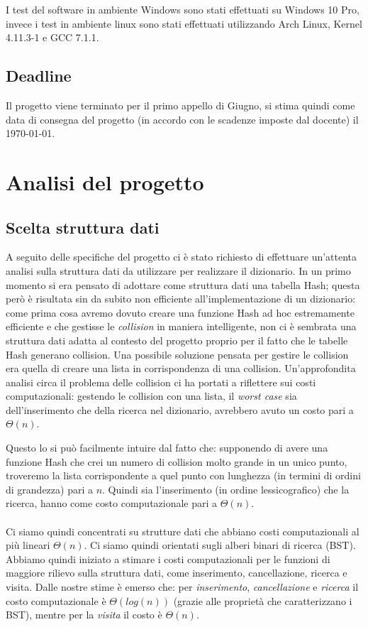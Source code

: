 \documentclass[paper=a4, fontsize=11pt,twoside]{scrartcl}   %
\begin{document}
			 	I test del software in ambiente Windows sono stati effettuati su Windows 10 Pro, invece i test in ambiente linux sono stati effettuati utilizzando Arch Linux, Kernel 4.11.3-1 e GCC 7.1.1.
			 \subsection{Deadline}
			 	Il progetto viene terminato per il primo appello di Giugno, si stima quindi come data di consegna del progetto (in accordo con le scadenze imposte dal docente) il \today.
			 	
		\section{Analisi del progetto}
			\subsection{Scelta struttura dati}
				 A seguito delle specifiche del progetto ci è stato richiesto di effettuare un'attenta analisi sulla struttura dati da utilizzare per realizzare il dizionario. In un primo momento si era pensato di adottare come struttura dati una tabella Hash; questa però è risultata sin da subito non efficiente all'implementazione di un dizionario: come prima cosa avremo dovuto creare una funzione Hash ad hoc estremamente efficiente e che gestisse le \textit{collision} in maniera intelligente, non ci è sembrata una struttura dati adatta al contesto del progetto proprio per il fatto che le tabelle Hash generano collision. Una possibile soluzione pensata per gestire le collision era quella di creare una lista in corrispondenza di una collision. Un'approfondita analisi circa il problema delle collision ci ha portati a riflettere sui costi computazionali: gestendo le collision con una lista, il \textit{worst case} sia dell'inserimento che della ricerca nel dizionario, avrebbero avuto un costo pari a $\Theta(n)$.
				 
				 Questo lo si può facilmente intuire dal fatto che: supponendo di avere una funzione Hash che crei un numero di collision molto grande in un unico punto, troveremo la lista corrispondente a quel punto con lunghezza (in termini di ordini di grandezza) pari a $n$. Quindi sia l'inserimento (in ordine lessicografico) che la ricerca, hanno come costo computazionale pari a $\Theta(n)$.\\\\
				 Ci siamo quindi concentrati su strutture dati che abbiano costi computazionali al più lineari $\Theta(n)$. Ci siamo quindi orientati sugli alberi binari di ricerca (BST).				 
				 Abbiamo quindi iniziato a stimare i costi computazionali per le funzioni di maggiore rilievo sulla struttura dati, come inserimento, cancellazione, ricerca e visita. Dalle nostre stime è emerso che: per \textit{inserimento}, \textit{cancellazione} e \textit{ricerca} il costo computazionale è $\Theta(log(n))$ (grazie alle proprietà che caratterizzano i BST), mentre per la \textit{visita} il costo è $\Theta(n)$.
				 
\end{document}
